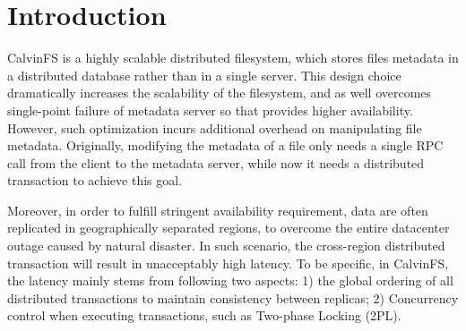 \section{Introduction}


CalvinFS is a highly scalable distributed filesystem, which stores files metadata in a distributed database rather than in a single server. This design choice dramatically increases the scalability of the filesystem, and as well overcomes single-point failure of metadata server so that provides higher availability. However, such optimization incurs additional overhead on manipulating file metadata. Originally, modifying the metadata of a file only needs a single RPC call from the client to the metadata server, while now it needs a distributed transaction to achieve this goal.

Moreover, in order to fulfill stringent availability requirement, data are often replicated in geographically separated regions, to overcome the entire datacenter outage caused by natural disaster. In such scenario, the cross-region distributed transaction will result in unacceptably high latency. To be specific, in CalvinFS, the latency mainly stems from following two aspects: 1) the global ordering of all distributed transactions to maintain consistency between replicas; 2) Concurrency control when executing transactions, such as Two-phase Locking (2PL).